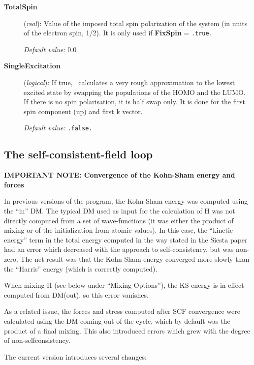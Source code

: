 \begin{description}
\item[\textbf{TotalSpin}] (\textit{real}):
Value of the imposed total spin polarization of the system (in units of the
electron spin, 1/2). It is only used
if \textbf{FixSpin} = \texttt{.true.}

\textit{Default value:} 0.0

\item[\textbf{SingleExcitation}] (\textit{logical}):
If true, \siesta\ calculates a very rough approximation to
the lowest excited state by swapping the populations of the HOMO
and the LUMO. If there is no spin polarisation, it is half swap only.
It is done for the first spin component (up) and first k vector.

\textit{Default value:} \texttt{.false.}

\end{description}

\vspace{5pt}
\subsection{The self-consistent-field loop}

\textbf{IMPORTANT NOTE: Convergence of the Kohn-Sham energy and forces}

In previous versions of the program, the Kohn-Sham energy was computed
using the ``in'' DM. The typical DM used as input for the calculation
of H was not directly computed from a set of wave-functions (it was
either the product of mixing or of the initialization from atomic
values). In this case, the ``kinetic energy'' term in the total energy
computed in the way stated in the Siesta paper had an error which
decreased with the approach to self-consistency, but was non-zero. The
net result was that the Kohn-Sham energy converged more slowly than
the ``Harris'' energy (which is correctly computed).

When mixing H (see below under ``Mixing Options''), the KS energy is
in effect computed from DM(out), so this error vanishes.

As a related issue, the forces and stress computed after SCF
convergence were calculated using the DM coming out of the cycle,
which by default was the product of a final mixing. This also
introduced errors which grew with the degree of non-selfconsistency.

The current version introduces several changes:

